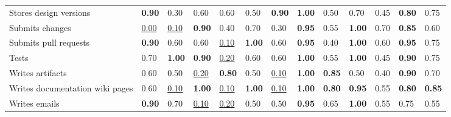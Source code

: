 \begin{tabular}{lllllllllllll}
Stores design versions & \textbf{0.90} & 0.30 & 0.60 & 0.60 & 0.50 & \textbf{0.90} & \textbf{1.00} & 0.50 & 0.70 & 0.45 & \textbf{0.80} & 0.75 \\
Submits changes & \underline{0.00} & \underline{0.10} & \textbf{0.90} & 0.40 & 0.70 & 0.30 & \textbf{0.95} & 0.55 & \textbf{1.00} & 0.70 & \textbf{0.85} & 0.60 \\
Submits pull requests & \textbf{0.90} & 0.60 & 0.60 & \underline{0.10} & \textbf{1.00} & 0.60 & \textbf{0.95} & 0.40 & \textbf{1.00} & 0.60 & \textbf{0.95} & 0.75 \\
Tests & 0.70 & \textbf{1.00} & \textbf{0.90} & \underline{0.20} & 0.60 & 0.60 & \textbf{1.00} & 0.55 & \textbf{1.00} & 0.45 & \textbf{0.90} & 0.75 \\
Writes artifacts & 0.60 & 0.50 & \underline{0.20} & \textbf{0.80} & 0.50 & \underline{0.10} & \textbf{1.00} & \textbf{0.85} & 0.50 & 0.40 & \textbf{0.90} & 0.70 \\
Writes documentation wiki pages & 0.60 & \underline{0.10} & \textbf{1.00} & \underline{0.10} & \textbf{1.00} & \underline{0.10} & \textbf{1.00} & \textbf{0.80} & \textbf{0.95} & 0.55 & \textbf{0.80} & \textbf{0.85} \\
Writes emails & \textbf{0.90} & 0.70 & \underline{0.10} & \underline{0.20} & 0.50 & 0.50 & \textbf{0.95} & 0.65 & \textbf{1.00} & 0.55 & 0.75 & 0.55 \\
\bottomrule
\end{tabular}
